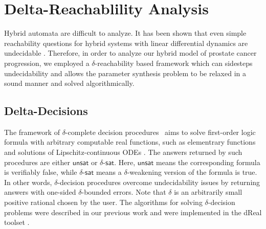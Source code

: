 \section{Delta-Reachablility Analysis}



Hybrid automata are difficult to analyze. It has been shown that even simple reachability questions for hybrid 
systems with linear differential dynamics are undecidable \citep{henzinger96}. Therefore, in order to analyze our hybrid model of prostate cancer progression, we employed a $\delta$-reachability based framework \cite{liu14} which can sidesteps undecidability and allows the parameter synthesis problem to be relaxed in a sound manner and solved algorithmically. 

\subsection{Delta-Decisions}
The framework of $\delta$-complete decision procedures~\cite{gao12a} aims to solve first-order logic formula with arbitrary computable real functions, such as elementrary functions and solutions of Lipschitz-continuous ODEs \citep{gao12b}. The answers returned by such procedures are either $\mathsf{unsat}$ or $\delta$-$\mathsf{sat}$. Here, $\mathsf{unsat}$ means the corresponding formula is verifiably false, while $\delta$-$\mathsf{sat}$ means a $\delta$-weakening version of the formula is true. In other words, $\delta$-decision procedures overcome undecidability issues by returning answers with one-sided $\delta$-bounded errors. Note that $\delta$ is an arbitrarily small positive rational chosen by the user. The algorithms for solving $\delta$-decision problems were described in our previous work\cite{gao12b,gao13} and were implemented in the dReal toolset \cite{dreal}. 

